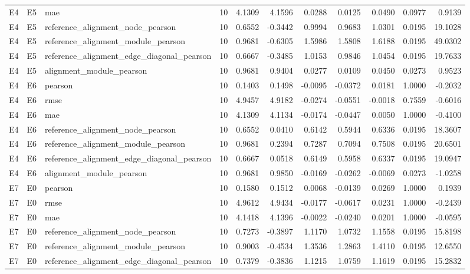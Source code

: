 \begin{tabular}{lllrrrrrrrr}
E4 & E5 & mae & 10 & 4.1309 & 4.1596 & 0.0288 & 0.0125 & 0.0490 & 0.0977 & 0.9139 \\
E4 & E5 & reference_alignment_node_pearson & 10 & 0.6552 & -0.3442 & 0.9994 & 0.9683 & 1.0301 & 0.0195 & 19.1028 \\
E4 & E5 & reference_alignment_module_pearson & 10 & 0.9681 & -0.6305 & 1.5986 & 1.5808 & 1.6188 & 0.0195 & 49.0302 \\
E4 & E5 & reference_alignment_edge_diagonal_pearson & 10 & 0.6667 & -0.3485 & 1.0153 & 0.9846 & 1.0454 & 0.0195 & 19.7633 \\
E4 & E5 & alignment_module_pearson & 10 & 0.9681 & 0.9404 & 0.0277 & 0.0109 & 0.0450 & 0.0273 & 0.9523 \\
E4 & E6 & pearson & 10 & 0.1403 & 0.1498 & -0.0095 & -0.0372 & 0.0181 & 1.0000 & -0.2032 \\
E4 & E6 & rmse & 10 & 4.9457 & 4.9182 & -0.0274 & -0.0551 & -0.0018 & 0.7559 & -0.6016 \\
E4 & E6 & mae & 10 & 4.1309 & 4.1134 & -0.0174 & -0.0447 & 0.0050 & 1.0000 & -0.4100 \\
E4 & E6 & reference_alignment_node_pearson & 10 & 0.6552 & 0.0410 & 0.6142 & 0.5944 & 0.6336 & 0.0195 & 18.3607 \\
E4 & E6 & reference_alignment_module_pearson & 10 & 0.9681 & 0.2394 & 0.7287 & 0.7094 & 0.7508 & 0.0195 & 20.6501 \\
E4 & E6 & reference_alignment_edge_diagonal_pearson & 10 & 0.6667 & 0.0518 & 0.6149 & 0.5958 & 0.6337 & 0.0195 & 19.0947 \\
E4 & E6 & alignment_module_pearson & 10 & 0.9681 & 0.9850 & -0.0169 & -0.0262 & -0.0069 & 0.0273 & -1.0258 \\
E7 & E0 & pearson & 10 & 0.1580 & 0.1512 & 0.0068 & -0.0139 & 0.0269 & 1.0000 & 0.1939 \\
E7 & E0 & rmse & 10 & 4.9612 & 4.9434 & -0.0177 & -0.0617 & 0.0231 & 1.0000 & -0.2439 \\
E7 & E0 & mae & 10 & 4.1418 & 4.1396 & -0.0022 & -0.0240 & 0.0201 & 1.0000 & -0.0595 \\
E7 & E0 & reference_alignment_node_pearson & 10 & 0.7273 & -0.3897 & 1.1170 & 1.0732 & 1.1558 & 0.0195 & 15.8198 \\
E7 & E0 & reference_alignment_module_pearson & 10 & 0.9003 & -0.4534 & 1.3536 & 1.2863 & 1.4110 & 0.0195 & 12.6550 \\
E7 & E0 & reference_alignment_edge_diagonal_pearson & 10 & 0.7379 & -0.3836 & 1.1215 & 1.0759 & 1.1619 & 0.0195 & 15.2832 \\

\end{tabular}
